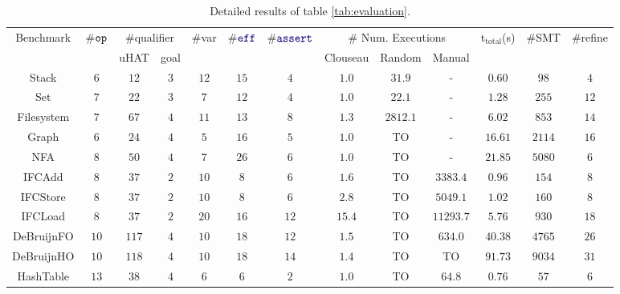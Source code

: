 \begin{table}[t!]
  \renewcommand{\arraystretch}{0.8}
  \caption{\small Detailed results of table \ref{tab:evaluation}.}
\vspace*{-.1in}
\footnotesize
\setlength{\tabcolsep}{3pt}
\begin{tabular}{c||ccc||ccc||ccc||c|cc}
  \toprule
Benchmark & \#$\boldsymbol{{\tt op}}$ & \multicolumn{2}{c||}{\#qualifier} & \#var &\#$\mykw{eff}$ & \#$\mykw{assert}$ & \multicolumn{3}{c||}{\scriptsize \# Num. Executions} & t$_\text{total}$(s) & \#SMT & \#refine  \\
 &  &uHAT &goal & & & & {\scriptsize Clouseau} & {\scriptsize Random} & {\scriptsize Manual} &  &  \\
 \midrule
 \textsf{Stack}\cite{ZYDJ24} & $6$ & $12$ & $3$ & $12$ & $15$ & $4$ & $1.0$ & $31.9$ & - & $0.60$ & $98$ & $4$\\
 \midrule
 \textsf{Set}\cite{ZYDJ24} & $7$ & $22$ & $3$ & $7$ & $12$ & $4$ & $1.0$ & $22.1$ & - & $1.28$ & $255$ & $12$\\
 \midrule
 \textsf{Filesystem}\cite{ZYDJ24} & $7$ & $67$ & $4$ & $11$ & $13$ & $8$ & $1.3$ & $2812.1$ & - & $6.02$ & $853$ & $14$\\
 \midrule
 \textsf{Graph}\cite{ZYDJ24} & $6$ & $24$ & $4$ & $5$ & $16$ & $5$ & $1.0$ & {\tiny TO} & - & $16.61$ & $2114$ & $16$\\
 \midrule
 \textsf{NFA}\cite{ZYDJ24} & $8$ & $50$ & $4$ & $7$ & $26$ & $6$ & $1.0$ & {\tiny TO} & - & $21.85$ & $5080$ & $6$\\
 \midrule
 \textsf{IFCAdd}\cite{pbt-ifc} & $8$ & $37$ & $2$ & $10$ & $8$ & $6$ & $1.6$ & {\tiny TO} & $3383.4$ & $0.96$ & $154$ & $8$\\
 \midrule
 \textsf{IFCStore}\cite{pbt-ifc} & $8$ & $37$ & $2$ & $10$ & $8$ & $6$ & $2.8$ & {\tiny TO} & $5049.1$ & $1.02$ & $160$ & $8$\\
 \midrule
 \textsf{IFCLoad}\cite{pbt-ifc} & $8$ & $37$ & $2$ & $20$ & $16$ & $12$ & $15.4$ & {\tiny TO} & $11293.7$ & $5.76$ & $930$ & $18$\\
 \midrule
 \textsf{DeBruijnFO}\cite{CoverageType} & $10$ & $117$ & $4$ & $10$ & $18$ & $12$ & $1.5$ & {\tiny TO} & $634.0$  & $40.38$ & $4765$ & $26$\\
 \midrule
 \textsf{DeBruijnHO}\cite{CoverageType} & $10$ & $118$ & $4$ & $10$ & $18$ & $14$ & $1.4$ & {\tiny TO} & {\tiny TO} & $91.73$ & $9034$ & $31$\\
 \midrule
 \textsf{HashTable}\cite{OcamlMulticorePBT} & $13$ & $38$ & $4$ & $6$ & $6$ & $2$ & $1.0$ & {\tiny TO} & $64.8$ & $0.76$ & $57$ & $6$\\

\end{tabular}
\end{table}
